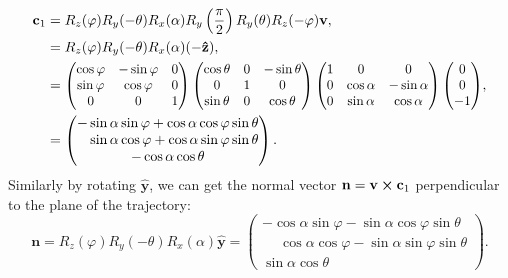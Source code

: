 				\begin{equation}
					\begin{aligned}
						\mathbf{c}_1 &= R_z(\varphi)R_y(-\theta)R_x(\alpha)R_y\left(\frac{\pi}{2}\right)R_y(\theta)R_z(-\varphi)\mathbf{v},\\
						&= R_z(\varphi)R_y(-\theta)R_x(\alpha)(-\mathbf{\hat{z}}),\\
						&= \scalebox{0.95}{$
								\begin{pmatrix}
									\cos\varphi & -\sin\varphi & 0\\
									\sin\varphi & \cos\varphi & 0\\
									0 & 0 & 1
								\end{pmatrix}
								\begin{pmatrix}
									\cos\theta & 0 & -\sin\theta\\
									0 & 1 & 0\\
									\sin\theta & 0 & \cos\theta
								\end{pmatrix}
								\begin{pmatrix}
									1 & 0 & 0\\
									0 & \cos\alpha & -\sin\alpha\\
									0 & \sin\alpha & \cos\alpha
								\end{pmatrix}
								\begin{pmatrix}
									0\\ 0\\ -1
								\end{pmatrix}
							$},\\
						&= 	\begin{pmatrix}
								-\sin\alpha\sin\varphi+\cos\alpha\cos\varphi\sin\theta\\
								\phantom{-}\sin\alpha\cos\varphi+\cos\alpha\sin\varphi\sin\theta\\
								-\cos\alpha\cos\theta
							\end{pmatrix}.
					\end{aligned}
				\end{equation}
			 Similarly by rotating $\mathbf{\hat{y}}$, we can get the normal vector $\mathbf{n}=\mathbf{v}\cross\mathbf{c}_1$ perpendicular to the plane of the trajectory:
				\begin{equation}
					\mathbf{n} = R_z(\varphi)R_y(-\theta)R_x(\alpha)\mathbf{\hat{y}}=
									\begin{pmatrix}
										-\cos\alpha\sin\varphi-\sin\alpha\cos\varphi\sin\theta\\
										\phantom{-}\cos\alpha\cos\varphi-\sin\alpha\sin\varphi\sin\theta\\
										\sin\alpha\cos\theta
									\end{pmatrix}.
				\end{equation}
